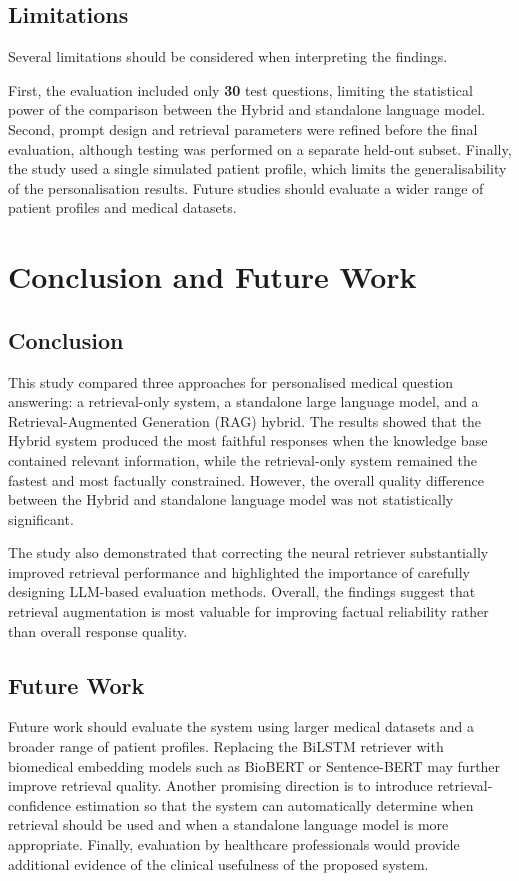 \subsection{Limitations}

Several limitations should be considered when interpreting the findings.

First, the evaluation included only \textbf{30} test questions, limiting the statistical power of the comparison between the Hybrid and standalone language model. Second, prompt design and retrieval parameters were refined before the final evaluation, although testing was performed on a separate held-out subset. Finally, the study used a single simulated patient profile, which limits the generalisability of the personalisation results. Future studies should evaluate a wider range of patient profiles and medical datasets.

\section{Conclusion and Future Work}
\label{sec:Conclusion}

\subsection{Conclusion}

This study compared three approaches for personalised medical question answering: a retrieval-only system, a standalone large language model, and a Retrieval-Augmented Generation (RAG) hybrid. The results showed that the Hybrid system produced the most faithful responses when the knowledge base contained relevant information, while the retrieval-only system remained the fastest and most factually constrained. However, the overall quality difference between the Hybrid and standalone language model was not statistically significant.

The study also demonstrated that correcting the neural retriever substantially improved retrieval performance and highlighted the importance of carefully designing LLM-based evaluation methods. Overall, the findings suggest that retrieval augmentation is most valuable for improving factual reliability rather than overall response quality.

\subsection{Future Work}

Future work should evaluate the system using larger medical datasets and a broader range of patient profiles. Replacing the BiLSTM retriever with biomedical embedding models such as BioBERT or Sentence-BERT may further improve retrieval quality. Another promising direction is to introduce retrieval-confidence estimation so that the system can automatically determine when retrieval should be used and when a standalone language model is more appropriate. Finally, evaluation by healthcare professionals would provide additional evidence of the clinical usefulness of the proposed system.

\nocite{asai2024}
